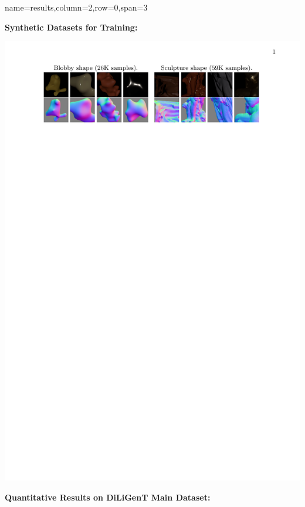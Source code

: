 \documentclass[a0paper,landscape]{baposter}
\begin{document}
\begin{poster}
    {name=results,column=2,row=0,span=3}
    {
        \begin{minipage}[t]{0.5\textwidth}
            \textbf{\color{blue}Synthetic Datasets for Training:} 
            \vspace{-0.2em}
            \begin{center}
                \includegraphics[width=\textwidth]{images/datasets.pdf}
            \end{center}
        \end{minipage}
        \begin{minipage}[t]{0.5\textwidth}
            \textbf{\color{blue}Quantitative Results on DiLiGenT Main Dataset:} 
            \vspace{-0.2em}
            \begin{center}

\end{center}
\end{minipage}}
\end{poster}
\end{document}
